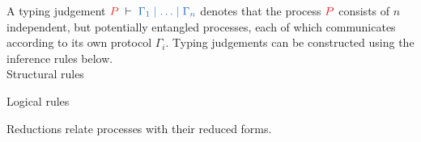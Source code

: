 \documentclass[envcountsame,UKenglish]{llncs}
\begin{document}
\begin{definition}\label{def:cp-typing-judgement}
  A typing judgement $\seq[P]{\Gamma_1 \hsep \dots \hsep \Gamma_n}$ denotes that the process $\tm{P}$ consists of $n$ independent, but potentially entangled processes, each of which communicates according to its own protocol $\Gamma_i$. Typing judgements can be constructed using the inference rules below. 
  \\[0.5\baselineskip]
  {Structural rules}
  \begin{center}
    \hcpInfAx
    \hcpInfCut
  \end{center}
  \begin{center}
    \hcpInfMix
    \hcpInfHalt
  \end{center}
  {Logical rules}
  \begin{center}
    \hcpInfBoundTens
    \hcpInfParr
  \end{center}
  \begin{center}
    \hcpInfOne
    \hcpInfBot
  \end{center}
  \begin{center}
  \end{center}
  \begin{center}
    \hcpInfWith
  \end{center}
  \begin{center}
    \hcpInfNil
    \hcpInfTop
  \end{center}
\end{definition}
Reductions relate processes with their reduced forms.
\end{document}

